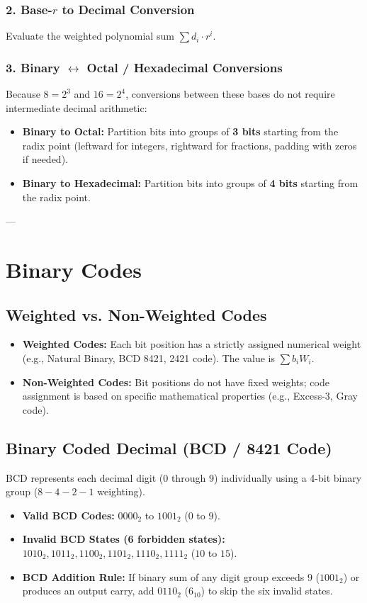 \subsubsection{2. \texorpdfstring{Base-$r$}{Base-r} to Decimal Conversion}
Evaluate the weighted polynomial sum $\sum d_i \cdot r^i$.

\subsubsection{3. \texorpdfstring{Binary $\leftrightarrow$ Octal / Hexadecimal}{Binary to Octal and Hexadecimal} Conversions}
Because $8 = 2^3$ and $16 = 2^4$, conversions between these bases do not require intermediate decimal arithmetic:
\begin{itemize}
    \item \textbf{Binary to Octal:} Partition bits into groups of \textbf{3 bits} starting from the radix point (leftward for integers, rightward for fractions, padding with zeros if needed).
    \item \textbf{Binary to Hexadecimal:} Partition bits into groups of \textbf{4 bits} starting from the radix point.
\end{itemize}

---

\section{Binary Codes}

\subsection{Weighted vs. Non-Weighted Codes}
\begin{itemize}
    \item \textbf{Weighted Codes:} Each bit position has a strictly assigned numerical weight (e.g., Natural Binary, BCD 8421, 2421 code). The value is $\sum b_i W_i$.
    \item \textbf{Non-Weighted Codes:} Bit positions do not have fixed weights; code assignment is based on specific mathematical properties (e.g., Excess-3, Gray code).
\end{itemize}

\subsection{Binary Coded Decimal (BCD / 8421 Code)}
BCD represents each decimal digit ($0$ through $9$) individually using a 4-bit binary group ($8-4-2-1$ weighting).
\begin{itemize}
    \item \textbf{Valid BCD Codes:} $0000_2$ to $1001_2$ ($0$ to $9$).
    \item \textbf{Invalid BCD States (6 forbidden states):} $1010_2, 1011_2, 1100_2, 1101_2, 1110_2, 1111_2$ ($10$ to $15$).
    \item \textbf{BCD Addition Rule:} If binary sum of any digit group exceeds $9$ ($1001_2$) or produces an output carry, add $0110_2$ ($6_{10}$) to skip the six invalid states.
\end{itemize}

